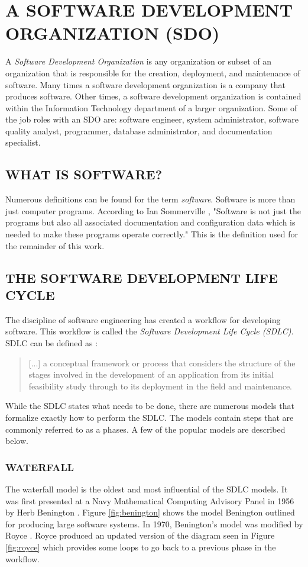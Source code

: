 \documentclass[SDSUThesis.tex]{subfiles}
\begin{document}
\section{A SOFTWARE DEVELOPMENT ORGANIZATION (SDO)}
A \textit{Software Development Organization} is any organization or subset of an organization that is responsible
for the creation, deployment, and maintenance of software.  Many times a software development organization
is a company that produces software.  Other times, a software development organization is contained
within the Information Technology department of a larger organization. Some of the job roles
with an SDO are: software engineer, system administrator, software quality analyst,
programmer, database administrator, and documentation specialist.


\subsection{WHAT IS SOFTWARE?}
Numerous definitions can be found for the term \textit{software}.
Software is more than just computer programs. According to Ian Sommerville \cite{Sommerville2001}, 
"Software is not just the programs but also all associated documentation and configuration data which is needed to make these programs operate correctly."
This is the definition used for the remainder of this work.


\subsection{THE SOFTWARE DEVELOPMENT LIFE CYCLE}
    The discipline of software engineering has created a workflow for developing
    software.  
    This workflow is called the \textit{Software Development Life Cycle (SDLC)}.
    SDLC can be defined as \cite{Ruparelia2010}:
    \begin{quote}
     [...] a conceptual framework or process that considers the structure of the stages
     involved in the development of an application from its initial feasibility study
     through to its deployment in the field and maintenance.
    \end{quote}
    While the SDLC states what needs to be done, there are numerous models 
    that formalize exactly how to perform the SDLC.  The models contain
    steps that are commonly referred to as a phases. A few of the popular
    models are described below.
    
    
    \subsubsection{WATERFALL}
        The waterfall model is the oldest and most influential of the SDLC models. 
        It was first presented at a Navy Mathematical Computing Advisory Panel in 1956
        by Herb Benington \cite{Benington1987}. Figure \ref{fig:benington} shows
        the model Benington outlined for producing large software systems.  
        In 1970, Benington's model was modified by Royce \cite{Royce1987}.  Royce
        produced an updated version of the diagram seen in Figure \ref{fig:royce}
        which provides some loops to go back to a previous phase in the workflow.
    
\end{document}

